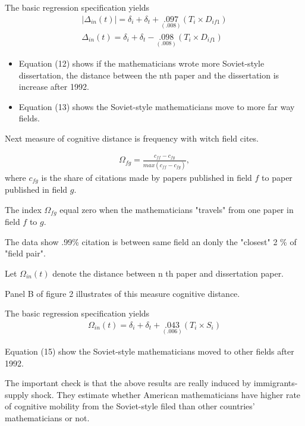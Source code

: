 \documentclass[../root]{subfiles}
\begin{document}
    The basic regression specification yields 
    \begin{align}
        |\Delta_{in}(t)| = \delta_i + \delta_t +\underset{(.008)}{.097} (T_i \times D_{if1}) \\
        \Delta_{in}(t) = \delta_i + \delta_t -\underset{(.008)}{.098} (T_i \times D_{if1})
    \end{align}
    
    \begin{itemize}
        \item Equation (12) shows if the mathematicians wrote more Soviet-style dissertation, the distance between the nth paper and the dissertation is increase after 1992.
        \item Equation (13) shows the Soviet-style mathematicians move to more far way fields.
    \end{itemize}
    
    Next measure of cognitive distance is frequency with witch field cites.
    
    \begin{align}
        \Omega_{fg}=\frac{c_{ff}-c_{fg}} {max(c_{ff}-c_{fg})} ,
    \end{align}
    where $c_{fg}$ is the share of citations made by papers published in field $f$ to paper published in field $g$.
    
    The index $\Omega_{fg}$ equal zero when the mathematicians "travels" from one paper in field $f$ to $g$.
    
    The data show .99\% citation is between same field an donly the  "closest"  2 \% of "field pair".
    
    Let $\Omega_{in}(t)$ denote the distance between n th paper and dissertation paper. 
    
    Panel B of figure 2 illustrates of this measure cognitive distance.
    
    The basic regression specification yields
    \begin{align}
        \Omega_{in}(t) = \delta_i + \delta_t + \underset{(.006)}{.043}(T_i \times S_i)
    \end{align}
    
    Equation (15) show the Soviet-style mathematicians moved to other fields after 1992.
    
    The important check is that the above results are really induced by immigrants-supply shock. 
    They estimate whether American mathematicians have higher rate of cognitive mobility from the Soviet-style filed than other countries' mathematicians or not.   
    
\end{document}
